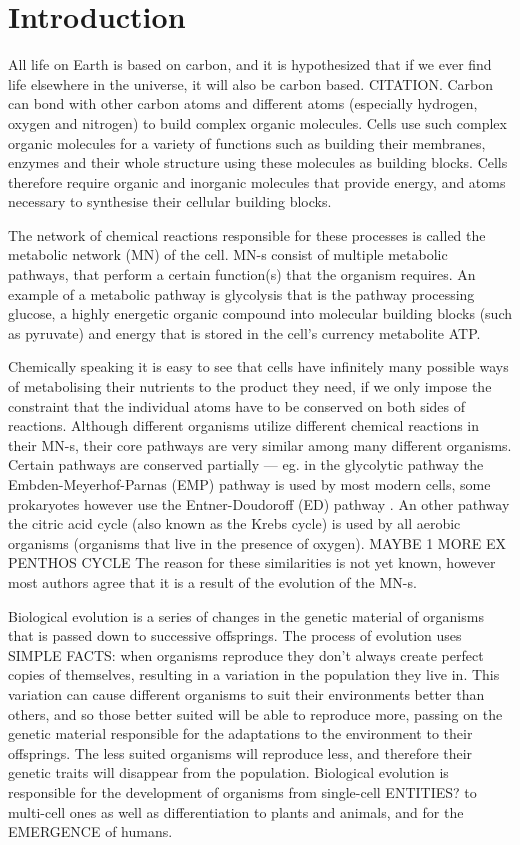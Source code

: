 \documentclass[10pt,a4paper]{article}
\begin{document}
	\section{Introduction}

	All life on Earth is based on carbon, and it is hypothesized that if we ever find life elsewhere in the universe, it will also be carbon based. CITATION. Carbon can bond with other carbon atoms and different atoms (especially hydrogen, oxygen and nitrogen) to build complex organic molecules. Cells use such complex organic molecules for a variety of functions such as building their membranes, enzymes and their whole structure using these molecules as building blocks. Cells therefore require organic and inorganic molecules that provide energy, and atoms necessary to synthesise their cellular building blocks.

	The network of chemical reactions responsible for these processes is called the metabolic network (MN) of the cell. MN-s consist of multiple metabolic pathways, that perform a certain function(s) that the organism requires. An example of a metabolic pathway is glycolysis that is the pathway processing glucose, a highly energetic organic compound into molecular building blocks (such as pyruvate) and energy that is stored in the cell's currency metabolite ATP.
	
	Chemically speaking it is easy to see that cells have  infinitely many possible ways of metabolising their nutrients to the product they need, if we only impose the constraint that the individual atoms have to be conserved on both sides of reactions. Although different organisms utilize different chemical reactions in their MN-s, their core pathways are very similar among many different organisms. Certain pathways are conserved partially ---  eg. in the glycolytic pathway the Embden-Meyerhof-Parnas (EMP) pathway \cite{EMPpathway} is used by most modern cells,  some prokaryotes however  use the Entner-Doudoroff (ED) pathway \cite{EDpathway}. An other pathway the citric acid cycle (also known as the Krebs cycle) is used by all aerobic organisms (organisms that live in the presence of oxygen). MAYBE 1 MORE EX PENTHOS CYCLE
	The reason for these similarities is not yet known, however most authors agree that it is a result of the evolution of the MN-s. 

	Biological evolution is a series of changes in the genetic material of organisms that is passed down to successive offsprings. The process of evolution uses SIMPLE FACTS: when organisms reproduce they don't always create perfect copies of themselves, resulting in a variation in the population they live in. This variation can cause different organisms to suit their environments better than others, and so those better suited will be able to reproduce more, passing on the genetic material responsible for the adaptations to the environment to their offsprings. The less suited organisms will reproduce less, and therefore their genetic traits will disappear from the population. 
	 Biological evolution is responsible for the development of organisms from single-cell ENTITIES? to multi-cell ones as well as differentiation to plants and animals, and for the EMERGENCE of humans. 
\end{document}
